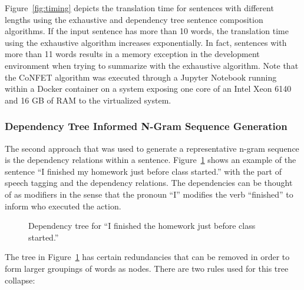 \documentclass{article}[10]
\begin{document}
Figure~\ref{fig:timing} depicts the translation time for sentences with
different lengths using the exhaustive and dependency tree sentence composition
algorithms. If the input sentence has more than 10 words, the translation time
using the exhaustive algorithm increases exponentially. In fact, sentences with
more than 11 words results in a memory exception in the development environment
when trying to summarize with the exhaustive algorithm. Note that the CoNFET
algorithm was executed through a Jupyter Notebook running within a Docker
container on a system exposing one core of an Intel Xeon 6140 and 16 GB of RAM
to the virtualized system.

\subsubsection{Dependency Tree Informed N-Gram Sequence
  Generation\label{sec:dependency}}

The second approach that was used to generate a representative n-gram sequence
is the dependency relations within a sentence. Figure~\ref{fig:dep} shows an
example of the sentence ``I finished my homework just before class started.''
with the part of speech tagging and the dependency relations. The dependencies
can be thought of as modifiers in the sense that the pronoun ``I'' modifies the
verb ``finished'' to inform who executed the action.

\begin{figure}[H]
  \begin{center}
    \caption{Dependency tree for ``I finished the homework just before class
      started.''\label{fig:dep}}
  \end{center}
\end{figure}

The tree in Figure~\ref{fig:dep} has certain redundancies that can be removed in
order to form larger groupings of words as nodes. There are two rules used for this tree collapse:
\end{document}
